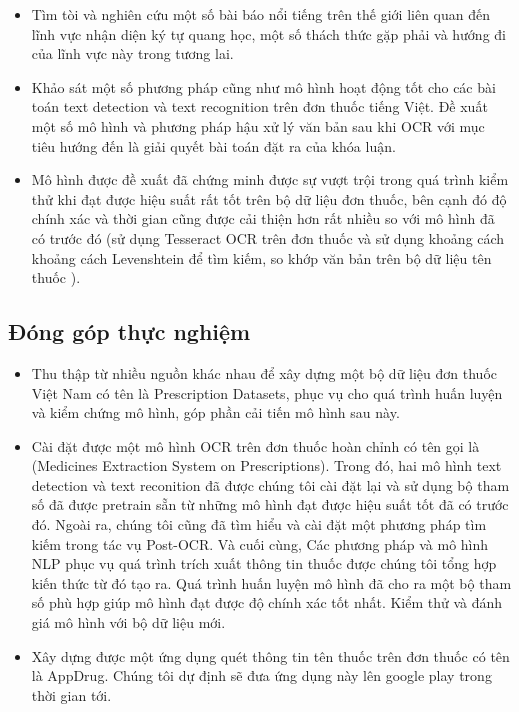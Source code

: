 \begin{itemize}
    \item Tìm tòi và nghiên cứu một số bài báo nổi tiếng trên thế giới liên quan đến lĩnh vực nhận diện
ký tự quang học, một số thách thức gặp phải và hướng đi của lĩnh vực này trong tương lai.
    \item Khảo sát một số phương pháp cũng như mô hình hoạt động tốt cho các bài toán text
detection và text recognition trên đơn thuốc tiếng Việt. Đề xuất một số mô hình và phương
pháp hậu xử lý văn bản sau khi OCR với mục tiêu hướng đến là giải quyết bài toán đặt ra
của khóa luận.
    \item Mô hình được đề xuất đã chứng minh được sự vượt trội trong quá trình kiểm thử khi đạt
được hiệu suất rất tốt trên bộ dữ liệu đơn thuốc, bên cạnh đó độ chính xác và thời gian cũng
được cải thiện hơn rất nhiều so với mô hình đã có trước đó (sử dụng Tesseract OCR trên
đơn thuốc và sử dụng khoảng cách khoảng cách Levenshtein để tìm kiếm, so khớp văn bản
trên bộ dữ liệu tên thuốc \cite{nguyen2021developing}).
\end{itemize}

\subsection{Đóng góp thực nghiệm}

\begin{itemize}
    \item Thu thập từ nhiều nguồn khác nhau để xây dựng một bộ dữ liệu đơn thuốc Việt Nam có tên là Prescription Datasets, phục
vụ cho quá trình huấn luyện và kiểm chứng mô hình, góp phần cải tiến mô hình sau này.
        \item Cài đặt được một mô hình OCR trên đơn thuốc hoàn chỉnh có tên gọi là  (Medicines
Extraction System on Prescriptions). Trong đó, hai mô hình text detection và text reconition
đã được chúng tôi cài đặt lại và sử dụng bộ tham số đã được pretrain sẵn từ những mô hình
đạt được hiệu suất tốt đã có trước đó. Ngoài ra, chúng tôi cũng đã tìm hiểu và cài đặt một phương pháp tìm kiếm trong tác vụ Post-OCR. Và cuối cùng, Các phương pháp và mô hình NLP phục vụ quá trình trích xuất thông tin thuốc được chúng tôi tổng hợp kiến thức từ đó tạo ra. Quá trình huấn luyện mô hình đã
cho ra một bộ tham số phù hợp giúp mô hình đạt được độ chính xác tốt nhất. Kiểm thử và
đánh giá mô hình với bộ dữ liệu mới.
    \item Xây dựng được một ứng dụng quét thông tin tên thuốc trên đơn thuốc có tên là AppDrug.
Chúng tôi dự định sẽ đưa ứng dụng này lên google play trong thời gian tới.
\end{itemize}

